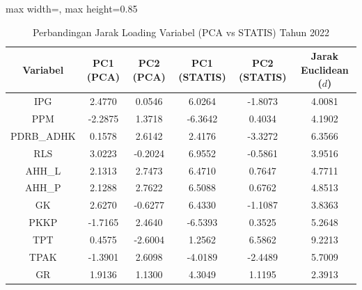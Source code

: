 \begin{table}[H]
\centering
\caption{Perbandingan Jarak Loading Variabel (PCA vs STATIS) Tahun 2022} \label{tab:app1jarak_loading_2022}
\begin{adjustbox}{max width=\textwidth, max height=0.85\textheight}
\begin{tabular}{|c|c|c|c|c|c|}
\hline
\textbf{Variabel} & \textbf{PC1 (PCA)} & \textbf{PC2 (PCA)} & \textbf{PC1 (STATIS)} & \textbf{PC2 (STATIS)} & \textbf{Jarak Euclidean ($d$)} \\
\hline
IPG & 2.4770 & 0.0546 & 6.0264 & -1.8073 & 4.0081 \\
PPM & -2.2875 & 1.3718 & -6.3642 & 0.4034 & 4.1902 \\
PDRB\_ADHK & 0.1578 & 2.6142 & 2.4176 & -3.3272 & 6.3566 \\
RLS & 3.0223 & -0.2024 & 6.9552 & -0.5861 & 3.9516 \\
AHH\_L & 2.1313 & 2.7473 & 6.4710 & 0.7647 & 4.7711 \\
AHH\_P & 2.1288 & 2.7622 & 6.5088 & 0.6762 & 4.8513 \\
GK & 2.6270 & -0.6277 & 6.4330 & -1.1087 & 3.8363 \\
PKKP & -1.7165 & 2.4640 & -6.5393 & 0.3525 & 5.2648 \\
TPT & 0.4575 & -2.6004 & 1.2562 & 6.5862 & 9.2213 \\
TPAK & -1.3901 & 2.6098 & -4.0189 & -2.4489 & 5.7009 \\
GR & 1.9136 & 1.1300 & 4.3049 & 1.1195 & 2.3913 \\
\hline
\end{tabular}
\end{adjustbox}
\end{table}